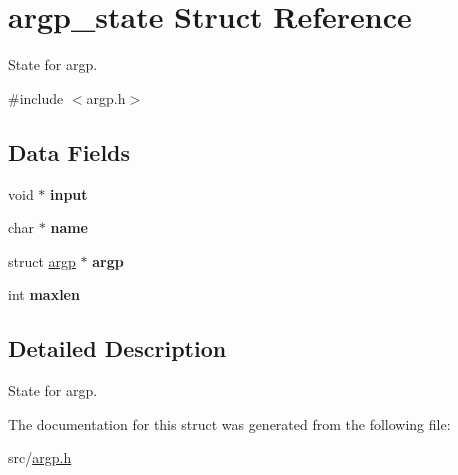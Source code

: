 \hypertarget{structargp__state}{}\section{argp\+\_\+state Struct Reference}
\label{structargp__state}


State for argp.  




{\ttfamily \#include $<$argp.\+h$>$}

\subsection*{Data Fields}
\begin{DoxyCompactItemize}
\item 
\hypertarget{structargp__state_a67a81c353a4529576ada52e3894ab9c1}{}\label{structargp__state_a67a81c353a4529576ada52e3894ab9c1} 
void $\ast$ {\bfseries input}
\item 
\hypertarget{structargp__state_a7f26462efb02001489ec29e1a08cd9a7}{}\label{structargp__state_a7f26462efb02001489ec29e1a08cd9a7} 
char $\ast$ {\bfseries name}
\item 
\hypertarget{structargp__state_a5db92434657409c39af1c805db05238f}{}\label{structargp__state_a5db92434657409c39af1c805db05238f} 
struct \hyperlink{structargp}{argp} $\ast$ {\bfseries argp}
\item 
\hypertarget{structargp__state_a88be2b34621be2c0aca44da29d5c7579}{}\label{structargp__state_a88be2b34621be2c0aca44da29d5c7579} 
int {\bfseries maxlen}
\end{DoxyCompactItemize}


\subsection{Detailed Description}
State for argp. 

The documentation for this struct was generated from the following file\+:\begin{DoxyCompactItemize}
\item 
src/\hyperlink{argp_8h}{argp.\+h}\end{DoxyCompactItemize}
